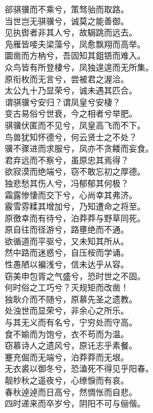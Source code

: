 \documentclass[]{article}
\begin{document}
郤骐骥而不乘兮，策驽骀而取路。\\
当世岂无骐骥兮，诚莫之能善御。\\
见执辔者非其人兮，故駶跳而远去。\\
凫雁皆唼夫梁藻兮，凤愈飘翔而高举。\\
圜凿而方枘兮，吾固知其鉏铻而难入。\\
众鸟皆有所登棲兮，凤独遑遑而无所集。\\
原衔枚而无言兮，尝被君之渥洽。\\
太公九十乃显荣兮，诚未遇其匹合。\\
谓骐骥兮安归？谓凤皇兮安棲？\\
变古易俗兮世衰，今之相者兮举肥。\\
骐骥伏匿而不见兮，凤皇高飞而不下。\\
鸟兽犹知怀德兮，何云贤士之不处？\\
骥不骤进而求服兮，凤亦不贪餧而妄食。\\
君弃远而不察兮，虽原忠其焉得？\\
欲寂漠而绝端兮，窃不敢忘初之厚德。\\
独悲愁其伤人兮，冯郁郁其何极？\\
霜露惨悽而交下兮，心尚幸其弗济。\\
霰雪雰糅其增加兮，乃知遭命之将至。\\
原徼幸而有待兮，泊莽莽与野草同死。\\
原自往而径游兮，路壅绝而不通。\\
欲循道而平驱兮，又未知其所从。\\
然中路而迷惑兮，自压桉而学诵。\\
性愚陋以褊浅兮，信未达乎从容。\\
窃美申包胥之气盛兮，恐时世之不固。\\
何时俗之工巧兮？灭规矩而改凿！\\
独耿介而不随兮，原慕先圣之遗教。\\
处浊世而显荣兮，非余心之所乐。\\
与其无义而有名兮，宁穷处而守高。\\
食不媮而为饱兮，衣不苟而为温。\\
窃慕诗人之遗风兮，原讬志乎素餐。\\
蹇充倔而无端兮，泊莽莽而无垠。\\
无衣裘以御冬兮，恐溘死不得见乎阳春。\\
靓杪秋之遥夜兮，心缭悷而有哀。\\
春秋逴逴而日高兮，然惆怅而自悲。\\
四时递来而卒岁兮，阴阳不可与俪偕。\\
\end{document}
